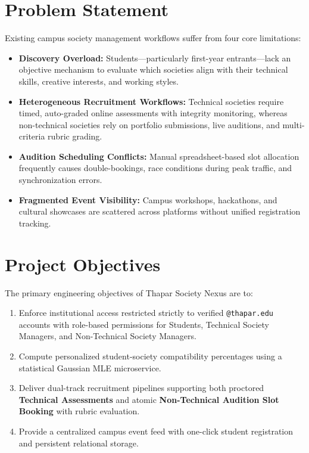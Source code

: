 \documentclass[12pt,a4paper]{report}
\begin{document}
\section{Problem Statement}
Existing campus society management workflows suffer from four core limitations:
\begin{itemize}[noitemsep]
    \item \textbf{Discovery Overload:} Students—particularly first-year entrants—lack an objective mechanism to evaluate which societies align with their technical skills, creative interests, and working styles.
    \item \textbf{Heterogeneous Recruitment Workflows:} Technical societies require timed, auto-graded online assessments with integrity monitoring, whereas non-technical societies rely on portfolio submissions, live auditions, and multi-criteria rubric grading.
    \item \textbf{Audition Scheduling Conflicts:} Manual spreadsheet-based slot allocation frequently causes double-bookings, race conditions during peak traffic, and synchronization errors.
    \item \textbf{Fragmented Event Visibility:} Campus workshops, hackathons, and cultural showcases are scattered across platforms without unified registration tracking.
\end{itemize}

\section{Project Objectives}
The primary engineering objectives of Thapar Society Nexus are to:
\begin{enumerate}[noitemsep]
    \item Enforce institutional access restricted strictly to verified \texttt{@thapar.edu} accounts with role-based permissions for Students, Technical Society Managers, and Non-Technical Society Managers.
    \item Compute personalized student-society compatibility percentages using a statistical Gaussian MLE microservice.
    \item Deliver dual-track recruitment pipelines supporting both proctored \textbf{Technical Assessments} and atomic \textbf{Non-Technical Audition Slot Booking} with rubric evaluation.
    \item Provide a centralized campus event feed with one-click student registration and persistent relational storage.
\end{enumerate}
\end{document}
